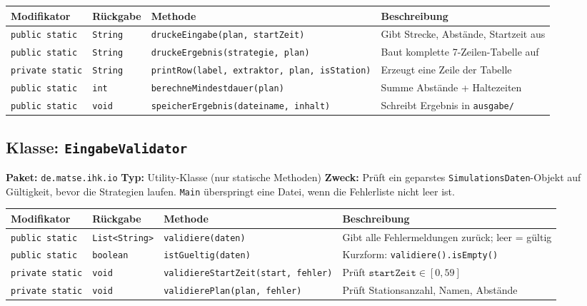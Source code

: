 \documentclass[12pt,a4paper]{article}
\begin{document}
\begin{center}
\small
\begin{tabular}{lllp{5.5cm}}
\toprule
\textbf{Modifikator} & \textbf{Rückgabe} & \textbf{Methode} & \textbf{Beschreibung} \\
\midrule
\texttt{public static}  & \texttt{String} & \texttt{druckeEingabe(plan, startZeit)} & Gibt Strecke, Abstände, Startzeit aus \\
\texttt{public static}  & \texttt{String} & \texttt{druckeErgebnis(strategie, plan)} & Baut komplette 7-Zeilen-Tabelle auf \\
\texttt{private static} & \texttt{String} & \texttt{printRow(label, extraktor, plan, isStation)} & Erzeugt eine Zeile der Tabelle \\
\texttt{public static}  & \texttt{int}    & \texttt{berechneMindestdauer(plan)} & Summe Abstände + Haltezeiten \\
\texttt{public static}  & \texttt{void}   & \texttt{speicherErgebnis(dateiname, inhalt)} & Schreibt Ergebnis in \texttt{ausgabe/} \\
\bottomrule
\end{tabular}
\end{center}

\subsection{Klasse: \texttt{EingabeValidator}}

\textbf{Paket:} \texttt{de.matse.ihk.io} \quad
\textbf{Typ:} Utility-Klasse (nur statische Methoden) \quad
\textbf{Zweck:} Prüft ein geparstes \texttt{SimulationsDaten}-Objekt auf Gültig\-keit,
bevor die Strategien laufen. \texttt{Main} überspringt eine Datei, wenn die
Fehlerliste nicht leer ist.

\begin{center}
\small
\begin{tabular}{lllp{5.5cm}}
\toprule
\textbf{Modifikator} & \textbf{Rückgabe} & \textbf{Methode} & \textbf{Beschreibung} \\
\midrule
\texttt{public static} & \texttt{List<String>} & \texttt{validiere(daten)} & Gibt alle Fehlermeldungen zurück; leer = gültig \\
\texttt{public static} & \texttt{boolean}      & \texttt{istGueltig(daten)} & Kurzform: \texttt{validiere().isEmpty()} \\
\texttt{private static} & \texttt{void} & \texttt{validiereStartZeit(start, fehler)} & Prüft $\mathtt{startZeit} \in [0, 59]$ \\
\texttt{private static} & \texttt{void} & \texttt{validierePlan(plan, fehler)} & Prüft Stationsanzahl, Namen, Abstände \\
\bottomrule
\end{tabular}
\end{center}
\end{document}
